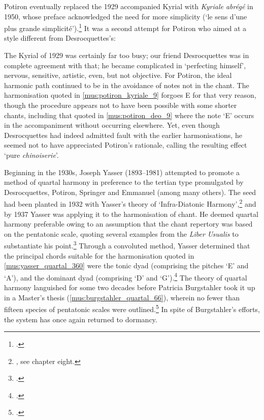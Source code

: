 \pagebreak{}
%
Potiron eventually replaced the 1929 accompanied Kyrial with \emph{Kyriale abrégé} in 1950, whose preface acknowledged the need for more simplicity (`le sens d'une plus grande simplicité').\footcite[4]{PotironKyrialeabregecontenant1950}
It was a second attempt for Potiron who aimed at a style different from Desrocquettes's:

  {}
{The Kyrial of 1929 was certainly far too busy; our friend Desrocquettes was in complete agreement with that; he became complicated in `perfecting himself', nervous, sensitive, artistic, even, but not objective.}
\noindent
For Potiron, the ideal harmonic path continued to be in the avoidance of notes not in the chant.
The harmonisation quoted in \cref{mus:potiron_kyriale_9} forgoes E\kern 1pt\flat{} for that very reason, though the procedure appears not to have been possible with some shorter chants, including that quoted in \cref{mus:potiron_deo_9} where the note `E' occurs in the accompaniment without occurring elsewhere.
Yet, even though Desrocquettes had indeed admitted fault with the earlier harmonisations, he seemed not to have appreciated Potiron's rationale, calling the resulting effect `pure \emph{chinoiserie}'.

Beginning in the 1930s, Joseph Yasser (1893--1981) attempted to promote a method of quartal harmony in preference to the tertian type promulgated by Desrocquettes, Potiron, Springer and Emmanuel (among many others).
The seed had been planted in 1932 with Yasser's theory of `Infra-Diatonic Harmony',\footnote{\covid{}\cite{YasserTheoryEvolvingTonality1932}, see chapter eight.} and by 1937 Yasser was applying it to the harmonisation of chant.
He deemed quartal harmony preferable owing to an assumption that the chant repertory was based on the pentatonic scale, quoting several examples from the \emph{Liber Usualis} to substantiate his point.\footcite[174, 181--2]{YasserMediaevalQuartalHarmony1937}
Through a convoluted method, Yasser determined that the principal chords suitable for the harmonisation quoted in \cref{mus:yasser_quartal_360} were the tonic dyad (comprising the pitches `E' and `A'), and the dominant dyad (comprising `D' and `G').\footcite[359--60]{YasserMediaevalQuartalHarmony1938}
The theory of quartal harmony languished for some two decades before Patricia Burgstahler took it up in a Master's thesis (\cref{mus:burgstahler_quartal_66}), wherein no fewer than fifteen species of pentatonic scales were outlined.\footcite[54, 66]{BurgstahlerAccompanimentGregorianChant1959}
In spite of Burgstahler's efforts, the system has once again returned to dormancy.

